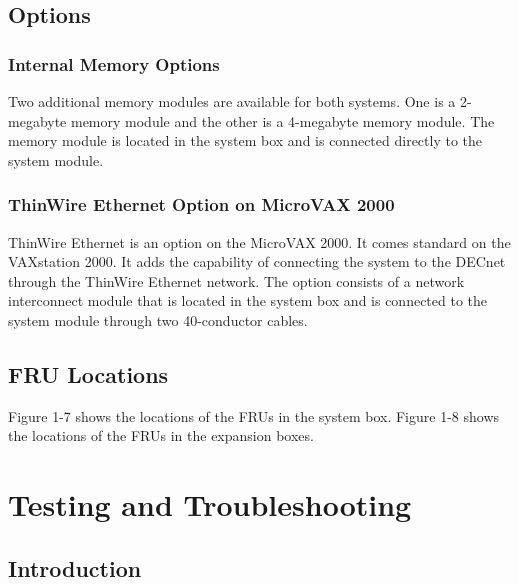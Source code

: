 \documentclass{decsectional}
\begin{document}

\newpage

\section{Options}
\subsection{Internal Memory Options}

Two additional memory modules are available for both systems. One is a 
2-megabyte memory module and the other is a 4-megabyte memory module.
The memory module is located in the system box and is connected directly
to the system module.

\subsection{ThinWire Ethernet Option on MicroVAX 2000}

ThinWire Ethernet is an option on the MicroVAX 2000. It comes standard
on the VAXstation 2000. It adds the capability of connecting the system to
the DECnet through the ThinWire Ethernet network. The option consists
of a network interconnect module that is located in the system box and is
connected to the system module through two 40-conductor cables.

\section{FRU Locations}

Figure 1-7 shows the locations of the FRUs in the system box. Figure 1-8
shows the locations of the FRUs in the expansion boxes.


\newpage


\newpage

\chapter{Testing and Troubleshooting}

\section{Introduction}
\end{document}

